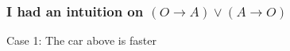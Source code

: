 \documentclass[slidestop,compress,mathserif]{beamer}
\begin{document}
 \begin{frame}
  \frametitle{I had an intuition on $(O\rightarrow
  A)\lor (A\rightarrow O)$}

  { Case 1: The car above is faster }

\end{frame}
\end{document}
